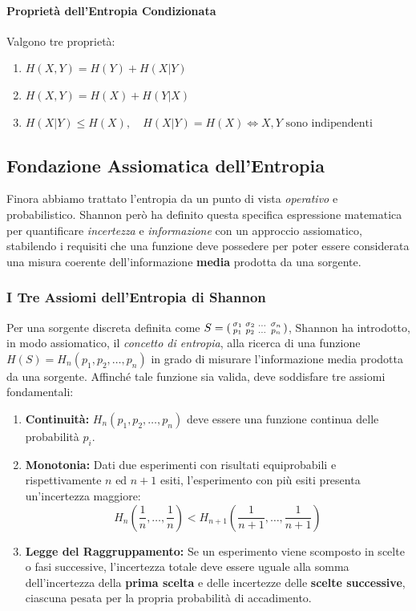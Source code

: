 \paragraph{Proprietà dell'Entropia Condizionata}
Valgono tre proprietà:
\begin{enumerate}
    \item $H(X,Y)= H(Y) + H(X|Y)$
    \item $H(X,Y)= H(X) + H(Y|X)$
    \item $H(X|Y) \leq H(X), \quad H(X|Y)=H(X) \iff X,Y\text{ sono indipendenti}$
\end{enumerate}


\subsection{Fondazione Assiomatica dell'Entropia}
Finora abbiamo trattato l'entropia da un punto di vista \textit{operativo} e probabilistico. Shannon però ha definito questa specifica espressione matematica per quantificare \textit{incertezza} e \textit{informazione} con un approccio assiomatico, stabilendo i requisiti che una funzione deve possedere per poter essere considerata una misura coerente dell'informazione \textbf{media} prodotta da una sorgente.

\subsubsection{I Tre Assiomi dell'Entropia di Shannon}
Per una sorgente discreta definita come $S = 
\begin{psmallmatrix}
 \sigma_1 & \sigma_2 & \dots & \sigma_n \\ p_1 & p_2 & \dots & p_n     
\end{psmallmatrix}$, Shannon ha introdotto, in modo assiomatico, il \textit{concetto di entropia}, alla ricerca di una funzione $H(S) = H_n(p_1, p_2, \dots, p_n)$ in grado di misurare l'informazione media prodotta da una sorgente. Affinché tale funzione sia valida, deve soddisfare tre assiomi fondamentali:
\begin{enumerate}
    \item \textbf{Continuità:} $H_n(p_1, p_2, \dots, p_n)$ deve essere una funzione continua delle probabilità $p_i$.
    
    \item \textbf{Monotonia:} Dati due esperimenti con risultati equiprobabili e rispettivamente $n$ ed $n+1$ esiti, l'esperimento con più esiti presenta un'incertezza maggiore:
    $$H_n\left(\frac{1}{n}, \dots, \frac{1}{n}\right) < H_{n+1}\left(\frac{1}{n+1}, \dots, \frac{1}{n+1}\right)$$
    
    \item \textbf{Legge del Raggruppamento:} Se un esperimento viene scomposto in scelte o fasi successive, l'incertezza totale deve essere uguale alla somma dell'incertezza della \textbf{prima scelta} e delle incertezze delle \textbf{scelte successive}, ciascuna pesata per la propria probabilità di accadimento.
    
\end{enumerate}

